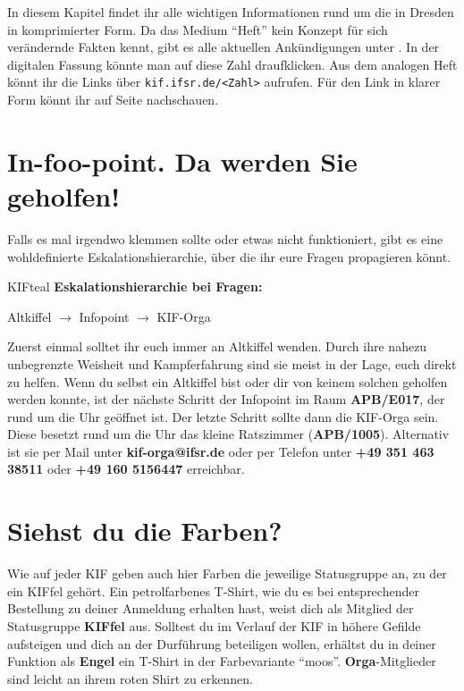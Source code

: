 
In diesem Kapitel findet ihr alle wichtigen Informationen rund um die \KIF{} in Dresden in komprimierter Form.
Da das Medium \enquote{Heft} kein Konzept für sich verändernde Fakten kennt, gibt es alle aktuellen Ankündigungen unter .
In der digitalen Fassung könnte man auf diese Zahl draufklicken.
Aus dem analogen Heft könnt ihr die Links über \texttt{kif.ifsr.de/<Zahl>} aufrufen.
Für den Link in klarer Form könnt ihr auf Seite \pageref{links} nachschauen.

\section*{In-foo-point. Da werden Sie geholfen!}

Falls es mal irgendwo klemmen sollte oder etwas nicht funktioniert, gibt es eine wohldefinierte Eskalationshierarchie, über die ihr eure Fragen propagieren könnt.

\begin{awesomeblock}[KIFteal]{2pt}{\faQuestion}{KIFteal}
    \textbf{Eskalationshierarchie bei Fragen:}

  Altkiffel $\longrightarrow$ Infopoint $\longrightarrow$ KIF-Orga
\end{awesomeblock}

Zuerst einmal solltet ihr euch immer an Altkiffel wenden.
Durch ihre nahezu unbegrenzte Weisheit und Kampferfahrung sind sie meist in der Lage, euch direkt zu helfen.
Wenn du selbst ein Altkiffel bist oder dir von keinem solchen geholfen werden konnte, ist der nächste Schritt der Infopoint im Raum \textbf{APB/E017}, der rund um die Uhr geöffnet ist.
Der letzte Schritt sollte dann die KIF-Orga sein.
Diese besetzt rund um die Uhr das kleine Ratszimmer (\textbf{APB/1005}).
Alternativ ist sie per Mail unter \textbf{kif-orga@ifsr.de} oder per Telefon unter \textbf{+49 351 463 38511} oder \textbf{+49 160 5156447} erreichbar.

\section*{Siehst du die Farben?}

Wie auf jeder KIF geben auch hier Farben die jeweilige Statusgruppe an, zu der ein KIFfel gehört.
Ein petrolfarbenes T-Shirt, wie du es bei entsprechender Bestellung zu deiner Anmeldung erhalten hast, weist dich als Mitglied der Statusgruppe \textbf{KIFfel} aus.
Solltest du im Verlauf der KIF in höhere Gefilde aufsteigen und dich an der Durführung beteiligen wollen, erhältst du in deiner Funktion als \textbf{Engel} ein T-Shirt in der Farbevariante \enquote{moos}.
\textbf{Orga}-Mitglieder sind leicht an ihrem roten Shirt zu erkennen.

